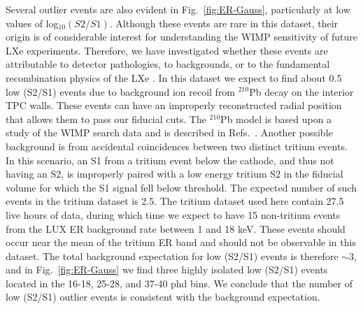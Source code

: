 Several outlier events are also evident in Fig.~\ref{fig:ER-Gauss}, particularly at low values of log$_{10}(S2/S1)$. Although these events are rare in this dataset, their origin is of considerable interest for understanding the WIMP sensitivity of future LXe experiments.  Therefore, we have investigated whether these events are attributable to detector pathologies, to backgrounds, or to the fundamental recombination physics of the LXe . In this dataset we expect to find about 0.5 low (S2/S1) events due to background ion recoil from $^{210}$Pb decay on the interior TPC walls. These events can have an improperly reconstructed radial position that allows them to pass our fiducial cuts.  
The $^{210}$Pb model is based upon a study of the WIMP search data and is described in Refs.~\cite{lux-reanalysis,Chang_Thesis}. Another possible background is from accidental coincidences between two distinct tritium events. In this scenario, an S1 from a tritium event below the cathode, and thus not having an S2, is improperly paired with a low energy tritium S2 in the fiducial volume for which the S1 signal fell below threshold. The expected number of such events in the tritium dataset is 2.5.  The tritium dataset used here contain 27.5 live hours of data, during which time we expect to have 15 non-tritium events from the LUX ER background rate between 1 and 18 keV. These events should occur near the mean of the tritium ER band and should not be observable in this dataset. The total background expectation for low (S2/S1) events is therefore $\sim$3, and in Fig.~\ref{fig:ER-Gauss} we find three highly isolated low (S2/S1) events located in the 16-18, 25-28, and 37-40 phd bins. We conclude that the number of low (S2/S1) outlier events is consistent with the background expectation.
